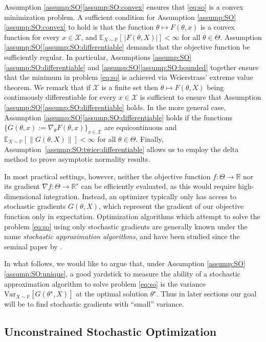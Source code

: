 \documentclass[11pt,a4paper]{article}
\theoremstyle{definition}
\newcommand{\norm}[1]{\| #1 \|}
\renewcommand{\Re}{\mathbb R}
\newcommand{\mc}{\mathcal}
\begin{document}
Assumption \ref{assump:SO}\ref{assump:SO:convex} ensures that \eqref{eq:so} is a convex minimization problem. A sufficient condition for Assumption \ref{assump:SO}\ref{assump:SO:convex} to hold is that the function $\theta \mapsto F(\theta, x)$ is a convex function for every $x\in \mathcal X$, and
\(
\mathbb E_{X \sim \mathbb P}\left[\,|F(\theta,X)|\right] < \infty
\)
for all $\theta\in \Theta$.
Assumption \ref{assump:SO}\ref{assump:SO:differentiable} demands that the objective function be sufficiently regular. In particular, Assumptions \ref{assump:SO}\ref{assump:SO:differentiable} and \ref{assump:SO}\ref{assump:SO:bounded} together ensure that the minimum in problem \eqref{eq:so} is achieved via Weierstrass' extreme value theorem. We remark that if $\mc X$ is a finite set then $\theta \mapsto F(\theta, X)$ being continuously differentiable for every $x\in \mathcal X$ is sufficient to ensure that Assumption \ref{assump:SO}\ref{assump:SO:differentiable} holds.
In the more general case, Assumption \ref{assump:SO}\ref{assump:SO:differentiable} holds if the functions $\{G(\theta, x) := \nabla_{\theta}F(\theta, x)\}_{x\in \mathcal X}$ are equicontinuous and $\mathbb E_{X \sim \mathbb P}\left[\norm{G(\theta,X)}\right] < \infty$ for all $\theta\in \Theta$.
Finally, Assumption~\ref{assump:SO:twice:differentiable} allows us to employ the delta method to prove asymptotic normality results.

In most practical settings, however, neither the objective function $f:\Theta\to\Re$ nor its gradient $\nabla f:\Theta\to\Re^s$ can be efficiently evaluated, as this would require high-dimensional integration. Instead, an optimizer typically only has access to stochastic gradients $G(\theta, X)$, which represent the gradient of our objective function only in expectation. Optimization algorithms which attempt to solve the problem \eqref{eq:so} using only stochastic gradients are generally known under the name \emph{stochastic approximation algorithms}, and have been studied since the seminal paper by \citet{robbins1951stochastic}. 

In what follows, we would like to argue that, under Assumption \ref{assump:SO}\ref{assump:SO:unique}, a good yardstick to measure the ability of a stochastic approximation algorithm to solve problem \eqref{eq:so} is the variance $\text{Var}_{X \sim \mathbb P}\left[G(\theta^\star,X)\right]$ at the optimal solution $\theta^\star$. Thus in later sections our goal will be to find stochastic gradients with ``small'' variance.


\subsection{Unconstrained Stochastic Optimization}
\label{subsec:unconstrained:stoch:approx}
\end{document}
